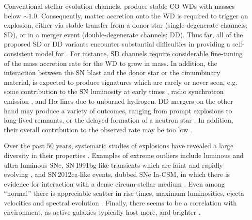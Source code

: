 \documentclass[../../main/thesis_msc.tex]{subfiles}
\begin{document}
  
Conventional stellar evolution channels, produce stable CO WDs with masses below $\sim 1.0$\msun. 
Consequently, matter accretion onto the WD is required to trigger an 
explosion, either via stable  transfer from a 
donor star (single-degenerate channels; SD), or in a 
merger event (double-degenerate channels; DD).  
Thus far, all of the proposed SD or DD variants    
encounter substantial difficulties in providing 
a self-consistent model for \ias \citep{Livio:2018rue}. 
For instance, SD channels require considerable fine-tuning
of the mass accretion rate for
the WD to grow in mass. In addition, the interaction between  
the SN blast and the donor star or the circumbinary material, is expected to produce  signatures which 
are rarely or never seen, e.g. some contribution to the SN  luminosity 
at early times \citep{Kasen:2009si}, radio synchrotron emission 
\citep{Harris:2016hfr}, and H$\alpha$ lines due to unburned hydrogen. 
DD mergers on the other hand may produce a variety of outcomes, 
ranging from prompt 
explosions to long-lived remnants, or the delayed formation of a neutron star \citep{Livio:2018rue}. In addition, their overall contribution to the observed \ia rate may be too low \citep{vanKerkwijk:2010he,claeys2014a,Sato:2015spa}. %

Over the past 50 years, systematic studies of \ia explosions have revealed a large
diversity in their properties \citep{Taubenberger:2017hoo}. 
Examples of extreme outliers include luminous 
\citep[e.g. SN\,1991T;][]{filippenko1992} and ultra-luminous  
\citep[e.g. SNLS-03D3bb;][]{Howell:2006vn} SNe, SN\,1991bg-like transients which
are faint and rapidly evolving \citep{ruiz-lapuente1993},  
and SN\,2012ca-like events, dubbed SNe Ia-CSM, in which 
there is evidence for interaction with a dense circum-stellar 
medium \citep{Bochenek:2017vok}. 
Even among ``normal'' \ias there is appreciable
scatter in rise times, maximum luminosities, ejecta velocities and spectral evolution   
\citep[][]{Livio:2018rue}. 
Finally, there seems to be a correlation with environment, 
as active  galaxies typically  host more,  and brighter \ias \citep{Maoz:2013hna}.
\end{document}
